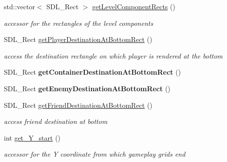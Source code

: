 \begin{DoxyCompactItemize}
std\+::vector$<$ S\+D\+L\+\_\+\+Rect $>$ \hyperlink{class_level_editor_a90c5ea5d07250f1fdaf5a4fec8c63f95}{get\+Level\+Component\+Rects} ()
\begin{DoxyCompactList}\small\item\em accessor for the rectangles of the level components \end{DoxyCompactList}\item 
\hypertarget{class_level_editor_a7eee89b657a94c1ec527e6cbbcd36c88}{}\label{class_level_editor_a7eee89b657a94c1ec527e6cbbcd36c88} 
S\+D\+L\+\_\+\+Rect \hyperlink{class_level_editor_a7eee89b657a94c1ec527e6cbbcd36c88}{get\+Player\+Destination\+At\+Bottom\+Rect} ()
\begin{DoxyCompactList}\small\item\em access the destination rectangle on which player is rendered at the bottom \end{DoxyCompactList}\item 
\hypertarget{class_level_editor_aa903012cca49d6ca806d675f09ab45c7}{}\label{class_level_editor_aa903012cca49d6ca806d675f09ab45c7} 
S\+D\+L\+\_\+\+Rect {\bfseries get\+Container\+Destination\+At\+Bottom\+Rect} ()
\item 
\hypertarget{class_level_editor_aae0552588840ef9557d94c97c7e08124}{}\label{class_level_editor_aae0552588840ef9557d94c97c7e08124} 
S\+D\+L\+\_\+\+Rect {\bfseries get\+Enemy\+Destination\+At\+Bottom\+Rect} ()
\item 
\hypertarget{class_level_editor_af7be1f25b9517657378c9f2de1b5eb40}{}\label{class_level_editor_af7be1f25b9517657378c9f2de1b5eb40} 
S\+D\+L\+\_\+\+Rect \hyperlink{class_level_editor_af7be1f25b9517657378c9f2de1b5eb40}{get\+Friend\+Destination\+At\+Bottom\+Rect} ()
\begin{DoxyCompactList}\small\item\em access friend destination at bottom \end{DoxyCompactList}\item 
\hypertarget{class_level_editor_aeeee371a1e351af567103e535e4eadf4}{}\label{class_level_editor_aeeee371a1e351af567103e535e4eadf4} 
int \hyperlink{class_level_editor_aeeee371a1e351af567103e535e4eadf4}{get\+\_\+\+Y\+\_\+start} ()
\begin{DoxyCompactList}\small\item\em accessor for the Y coordinate from which gameplay grids end \end{DoxyCompactList}\item 
\hypertarget{class_level_editor_aa52b52d95742ff2f9b23bc95482b1336}{}\label{class_level_editor_aa52b52d95742ff2f9b23bc95482b1336} 

\end{DoxyCompactItemize}
